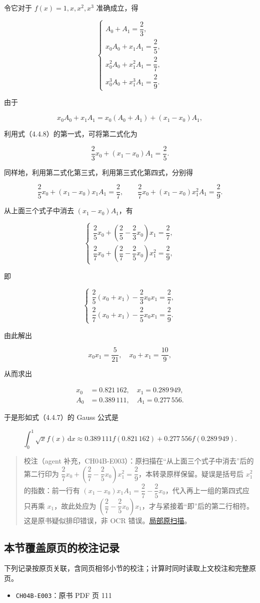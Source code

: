 \documentclass[
  10pt,
  fontset=fandol]{ctexart}
\providecommand{\tightlist}{%
  \setlength{\itemsep}{0pt}\setlength{\parskip}{0pt}}
\begin{document}
令它对于 \(f(x)=1,x,x^2,x^3\) 准确成立，得

\[
\begin{cases}
A_0+A_1=\dfrac23,\\[5pt]
x_0A_0+x_1A_1=\dfrac25,\\[5pt]
x_0^2A_0+x_1^2A_1=\dfrac27,\\[5pt]
x_0^3A_0+x_1^3A_1=\dfrac29.
\end{cases}
\tag{4.4.8}
\]

由于

\[
x_0A_0+x_1A_1=x_0(A_0+A_1)+(x_1-x_0)A_1,
\]

利用式（4.4.8）的第一式，可将第二式化为

\[
\frac23x_0+(x_1-x_0)A_1=\frac25.
\]

同样地，利用第二式化第三式，利用第三式化第四式，分别得

\[
\frac25x_0+(x_1-x_0)x_1A_1=\frac27,\qquad
\frac27x_0+(x_1-x_0)x_1^2A_1=\frac29.
\]

从上面三个式子中消去 \((x_1-x_0)A_1\)，有

\[
\begin{cases}
\dfrac25x_0+\left(\dfrac25-\dfrac23x_0\right)x_1=\dfrac27,\\[5pt]
\dfrac27x_0+\left(\dfrac27-\dfrac25x_0\right)x_1^2=\dfrac29,
\end{cases}
\]

即

\[
\begin{cases}
\dfrac25(x_0+x_1)-\dfrac23x_0x_1=\dfrac27,\\[5pt]
\dfrac27(x_0+x_1)-\dfrac25x_0x_1=\dfrac29.
\end{cases}
\]

由此解出

\[
x_0x_1=\frac5{21},\quad x_0+x_1=\frac{10}9,
\]

从而求出

\[
\begin{aligned}
x_0&=0.821\,162,\quad x_1=0.289\,949,\\
A_0&=0.389\,111,\quad A_1=0.277\,556.
\end{aligned}
\]

于是形如式（4.4.7）的 Gauss 公式是

\[
\int_0^1\sqrt{x}f(x)\,\mathrm{d}x
\approx0.389\,111f(0.821\,162)+0.277\,556f(0.289\,949).
\]

\begin{quote}
校注（agent 补充，CH04B-E003）：原扫描在``从上面三个式子中消去''后的第二行印为 \(\dfrac27x_0+\left(\dfrac27-\dfrac25x_0\right)x_1^2=\dfrac29\)，本转录原样保留。疑误是括号后 \(x_1^2\) 的指数：前一行有 \((x_1-x_0)x_1A_1=\dfrac27-\dfrac25x_0\)，代入再上一组的第四式应只再乘 \(x_1\)，故此处应为 \(\left(\dfrac27-\dfrac25x_0\right)x_1\)，才与紧接着``即''后的第二行相符。这是原书疑似排印错误，非 OCR 错误。\href{../assets/ch04b/review-p111-elimination.png}{局部原扫描}。
\end{quote}

\subsection{本节覆盖原页的校注记录}\label{ux672cux8282ux8986ux76d6ux539fux9875ux7684ux6821ux6ce8ux8bb0ux5f55}

下列记录按原页关联，含同页相邻小节的校注；计算时同时读取上文校注和完整原页。

\begin{itemize}
\tightlist
\item
  \texttt{CH04B-E003}：原书 PDF 页 111
\end{itemize}
\end{document}
